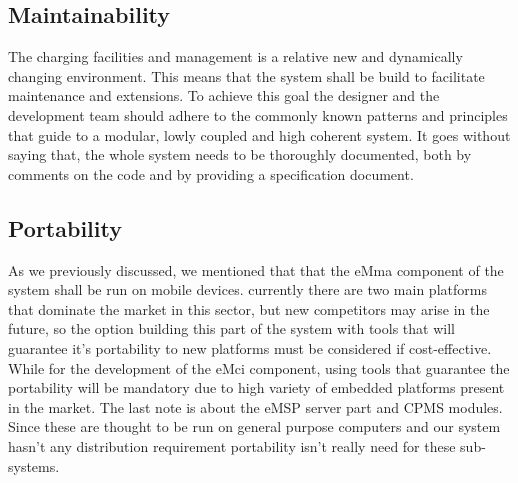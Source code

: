 \subsection{Maintainability}
The charging facilities and management is a relative new and dynamically changing environment. This means that the system shall be build to facilitate maintenance and extensions. To achieve this goal the designer and the development team should adhere to the commonly known patterns and principles that guide to a modular, lowly coupled and high coherent system. It goes without saying that, the whole system needs to be thoroughly documented, both by comments on the code and by providing a specification document. %

\subsection{Portability}
As we previously discussed, we mentioned that that the eMma component of the system shall be run on mobile devices. currently there are two main platforms that dominate the market in this sector, but new competitors may arise in the future, so the option building this part of the system with tools that will guarantee it's portability to new platforms must be considered if cost-effective. While for the development of the eMci component, using tools that guarantee the portability will be mandatory due to high variety of embedded platforms present in the market. The last note is about the eMSP server part and CPMS modules. Since these are thought to be run on general purpose computers and our system hasn't any distribution requirement portability isn't really need for these sub-systems. 